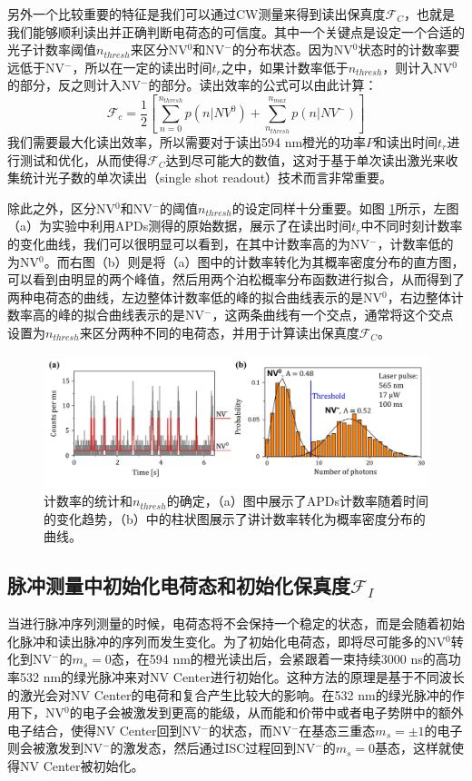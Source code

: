 \documentclass[type = bachelor]{whu-thesis}
\begin{document}
另外一个比较重要的特征是我们可以通过CW测量来得到读出保真度$\mathcal{F}_C$，也就是我们能够顺利读出并正确判断电荷态的可信度。其中一个关键点是设定一个合适的光子计数率阈值$n_{thresh}$来区分NV$^0$和NV$^-$的分布状态。因为NV$^0$状态时的计数率要远低于NV$^-$，所以在一定的读出时间$t_r$之中，如果计数率低于$n_{thresh}$，则计入NV$^0$的部分，反之则计入NV$^-$的部分。读出效率的公式可以由此计算：
\begin{equation}
  \mathcal{F}_c = \frac{1}{2}[\sum_{n=0}^{n_{thresh}}p(n|NV^0)+\sum_{n_{thresh}}^{n_{max}}p(n|NV^-)]
\end{equation}
我们需要最大化读出效率，所以需要对于读出594 nm橙光的功率$P$和读出时间$t_r$进行测试和优化，从而使得$\mathcal{F}_C$达到尽可能大的数值，这对于基于单次读出激光来收集统计光子数的单次读出（single shot readout）技术而言非常重要。

除此之外，区分NV$^0$和NV$^-$的阈值$n_{thresh}$的设定同样十分重要。如图 \ref{fig: n_thresh}所示，左图（a）为实验中利用APDs测得的原始数据，展示了在读出时间$t_r$中不同时刻计数率的变化曲线，我们可以很明显可以看到，在其中计数率高的为NV$^-$，计数率低的为NV$^0$。而右图（b）则是将（a）图中的计数率转化为其概率密度分布的直方图，可以看到由明显的两个峰值，然后用两个泊松概率分布函数进行拟合，从而得到了两种电荷态的曲线，左边整体计数率低的峰的拟合曲线表示的是NV$^0$，右边整体计数率高的峰的拟合曲线表示的是NV$^-$，这两条曲线有一个交点，通常将这个交点设置为$n_{thresh}$来区分两种不同的电荷态，并用于计算读出保真度$\mathcal{F}_C$。

\begin{figure}
  \centering
  \includegraphics[width=1.0\textwidth]{figures/Chapter 2/n_thresh.png}
  \caption[计数率的统计和$n_{thresh}$的确定]{计数率的统计和$n_{thresh}$的确定，（a）图中展示了APDs计数率随着时间的变化趋势，（b）中的柱状图展示了讲计数率转化为概率密度分布的曲线\cite{aslam2013photo}。}
  \label{fig: n_thresh}
\end{figure}

\subsection{脉冲测量中初始化电荷态和初始化保真度$\mathcal{F}_I$}
当进行脉冲序列测量的时候，电荷态将不会保持一个稳定的状态，而是会随着初始化脉冲和读出脉冲的序列而发生变化。为了初始化电荷态，即将尽可能多的NV$^0$转化到NV$^-$的$m_s=0$态，在594 nm的橙光读出后，会紧跟着一束持续3000 ns的高功率532 nm的绿光脉冲来对NV Center进行初始化。这种方法的原理是基于不同波长的激光会对NV Center的电荷和复合产生比较大的影响。在532 nm的绿光脉冲的作用下，NV$^0$的电子会被激发到更高的能级，从而能和价带中或者电子势阱中的额外电子结合，使得NV Center回到NV$^-$的状态，而NV$^-$在基态三重态$m_s=±1$的电子则会被激发到NV$^-$的激发态，然后通过ISC过程回到NV$^-$的$m_s=0$基态，这样就使得NV Center被初始化。
\end{document}
